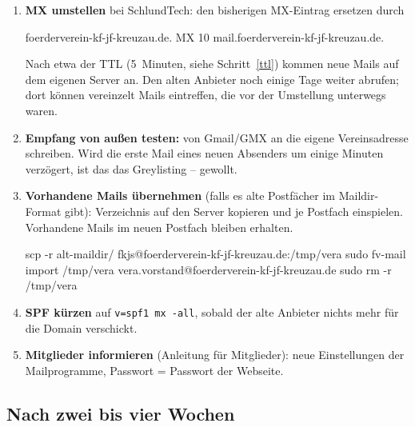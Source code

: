 \documentclass[a4paper,fontsize=10pt]{scrartcl}
\newcommand*{\cmd}[1]{\texttt{#1}}
\newcommand*{\erledigt}{\makebox[1.4em][l]{\setlength{\fboxsep}{0pt}\fbox{\rule{0pt}{0.7em}\hspace{0.7em}}}}
\begin{document}
\begin{enumerate}[resume]
  \item\label{mx} \erledigt\textbf{MX umstellen} bei SchlundTech: den bisherigen MX-Eintrag
        ersetzen durch
\begin{befehl}
foerderverein-kf-jf-kreuzau.de.   MX   10 mail.foerderverein-kf-jf-kreuzau.de.
\end{befehl}
        Nach etwa der TTL (5~Minuten, siehe Schritt~\ref{ttl}) kommen neue Mails auf
        dem eigenen Server an. Den alten Anbieter noch einige Tage weiter abrufen; dort
        können vereinzelt Mails eintreffen, die vor der Umstellung unterwegs waren.
  \item \erledigt\textbf{Empfang von außen testen:} von Gmail/GMX an die eigene
        Vereinsadresse schreiben. Wird die erste Mail eines neuen Absenders um einige
        Minuten verzögert, ist das das Greylisting -- gewollt.
  \item \erledigt\textbf{Vorhandene Mails übernehmen} (falls es alte Postfächer im
        Maildir-Format gibt): Verzeichnis auf den Server kopieren und je Postfach
        einspielen. Vorhandene Mails im neuen Postfach bleiben erhalten.
\begin{befehl}
scp -r alt-maildir/ fkjs@foerderverein-kf-jf-kreuzau.de:/tmp/vera
sudo fv-mail import /tmp/vera vera.vorstand@foerderverein-kf-jf-kreuzau.de
sudo rm -r /tmp/vera
\end{befehl}
  \item \erledigt\textbf{SPF kürzen} auf \cmd{v=spf1 mx -all}, sobald der alte Anbieter
        nichts mehr für die Domain verschickt.
  \item \erledigt\textbf{Mitglieder informieren} (Anleitung für Mitglieder): neue
        Einstellungen der Mailprogramme, Passwort = Passwort der Webseite.
\end{enumerate}

\subsection{Nach zwei bis vier Wochen}
\end{document}
